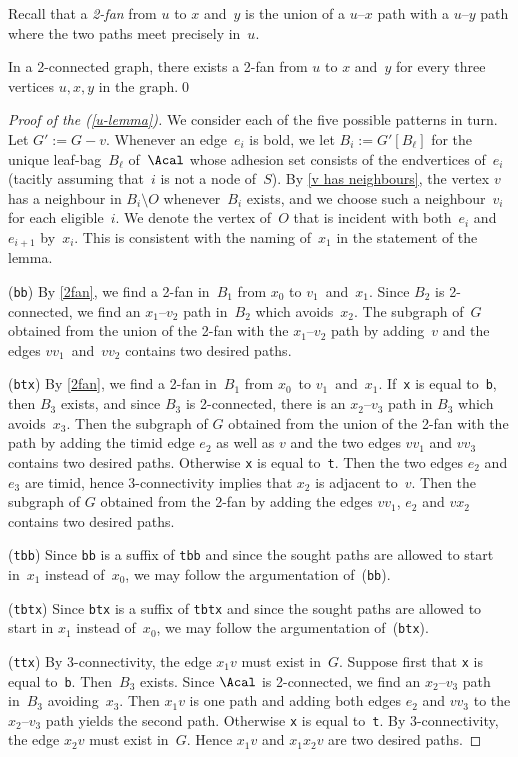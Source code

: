 \documentclass{aic}
\theoremstyle{plain}
\theoremstyle{definition}
\theoremstyle{plain}
\theoremstyle{plain}
\newcommand{\sm}{\setminus}
\newcommand{\ty}[1]{{\tt#1}}
\begin{document}
Recall that a \emph{2-fan} from $u$ to $x$ and~$y$ is the union of a $u$--$x$ path with a $u$--$y$ path where the two paths meet precisely in~$u$.

\begin{fact}\label{2fan}
In a 2-connected graph, there exists a 2-fan from $u$ to $x$ and~$y$ for every three vertices $u,x,y$ in the graph.\qed
\end{fact}


\begin{proof}[Proof of the  (\ref{u-lemma})]
We consider each of the five possible patterns in turn.
Let $G':=G-v$.
Whenever an edge~$e_i$ is bold, we let $B_i:=G'[B_\ell]$ for the unique leaf-bag~$B_\ell$ of~$\Acal$ whose adhesion set consists of the endvertices of~$e_i$ (tacitly assuming that~$i$ is not a node of~$S$).
By \autoref{v has neighbours}, the vertex $v$ has a neighbour in $B_i\sm O$ whenever~$B_i$ exists, and 
we choose such a neighbour~$v_i$ for each eligible~$i$.
We denote the vertex of~$O$ that is incident with both~$e_i$ and~$e_{i+1}$ by~$x_i$.
This is consistent with the naming of~$x_1$ in the statement of the lemma.

(\ty{bb}) By \autoref{2fan}, we find a 2-fan in~$B_1$ from $x_0$ to $v_1$~and~$x_1$.
Since $B_2$ is 2-connected, we find an $x_1$--$v_2$ path in~$B_2$ which avoids~$x_2$.
The subgraph of~$G$ obtained from the union of the 2-fan with the $x_1$--$v_2$ path by adding~$v$ 
and the edges $v v_1$~and~$v v_2$ contains two desired paths.

(\ty{btx}) By \autoref{2fan}, we find a 2-fan in~$B_1$ from $x_0$~to $v_1$~and~$x_1$.
If~\ty{x} is equal to~\ty{b}, then $B_3$ exists, and since $B_3$ is 2-connected, there is an $x_2$--$v_3$ path in 
$B_3$ which avoids~$x_3$.
Then the subgraph of $G$ obtained from the union of the 2-fan with the path by adding the timid 
edge $e_2$ as well as $v$ and the two edges $v v_1$ and $v v_3$ contains two desired paths.
Otherwise \ty{x} is equal to~\ty{t}.
Then the two edges $e_2$ and $e_3$ are timid, hence 3-connectivity implies that $x_2$ is adjacent 
to~$v$.
Then the subgraph of $G$ obtained from the 2-fan by adding the edges $v v_1$, $e_2$ and $v x_2$ 
contains two desired paths.

(\ty{tbb}) Since \ty{bb} is a suffix of \ty{tbb} and since the sought paths are allowed to start in~$x_1$ 
instead of~$x_0$, we may follow the argumentation of~(\ty{bb}).

(\ty{tbtx}) Since \ty{btx} is a suffix of \ty{tbtx} and since the sought paths are allowed to start in $x_1$ 
instead of~$x_0$, we may follow the argumentation of~(\ty{btx}).

(\ty{ttx}) By 3-connectivity, the edge $x_1 v$ must exist in~$G$.
Suppose first that \ty{x} is equal to~\ty{b}.
Then~$B_3$ exists. 
Since $\Acal$ is 2-connected, we find an $x_2$--$v_3$ path in~$B_3$ avoiding~$x_3$.
Then $x_1 v$ is one path and adding both edges $e_2$ and $v v_3$ to the $x_2$--$v_3$ path yields the 
second path.
Otherwise \ty{x} is equal to~\ty{t}.
By 3-connectivity, the edge $x_2 v$ must exist in~$G$.
Hence $x_1 v$ and $x_1 x_2 v$ are two desired paths.
\end{proof}
\end{document}

